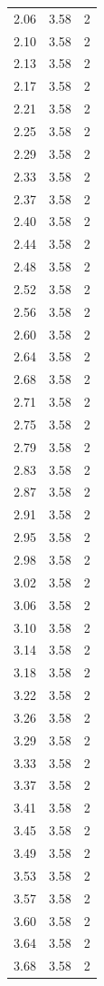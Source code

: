 \begin{longtable}{lrr}
  2.06 & 3.58 & 2 \\
  2.10 & 3.58 & 2 \\
  2.13 & 3.58 & 2 \\
  2.17 & 3.58 & 2 \\
  2.21 & 3.58 & 2 \\
  2.25 & 3.58 & 2 \\
  2.29 & 3.58 & 2 \\
  2.33 & 3.58 & 2 \\
  2.37 & 3.58 & 2 \\
  2.40 & 3.58 & 2 \\
  2.44 & 3.58 & 2 \\
  2.48 & 3.58 & 2 \\
  2.52 & 3.58 & 2 \\
  2.56 & 3.58 & 2 \\
  2.60 & 3.58 & 2 \\
  2.64 & 3.58 & 2 \\
  2.68 & 3.58 & 2 \\
  2.71 & 3.58 & 2 \\
  2.75 & 3.58 & 2 \\
  2.79 & 3.58 & 2 \\
  2.83 & 3.58 & 2 \\
  2.87 & 3.58 & 2 \\
  2.91 & 3.58 & 2 \\
  2.95 & 3.58 & 2 \\
  2.98 & 3.58 & 2 \\
  3.02 & 3.58 & 2 \\
  3.06 & 3.58 & 2 \\
  3.10 & 3.58 & 2 \\
  3.14 & 3.58 & 2 \\
  3.18 & 3.58 & 2 \\
  3.22 & 3.58 & 2 \\
  3.26 & 3.58 & 2 \\
  3.29 & 3.58 & 2 \\
  3.33 & 3.58 & 2 \\
  3.37 & 3.58 & 2 \\
  3.41 & 3.58 & 2 \\
  3.45 & 3.58 & 2 \\
  3.49 & 3.58 & 2 \\
  3.53 & 3.58 & 2 \\
  3.57 & 3.58 & 2 \\
  3.60 & 3.58 & 2 \\
  3.64 & 3.58 & 2 \\
  3.68 & 3.58 & 2 \\

\end{longtable}
